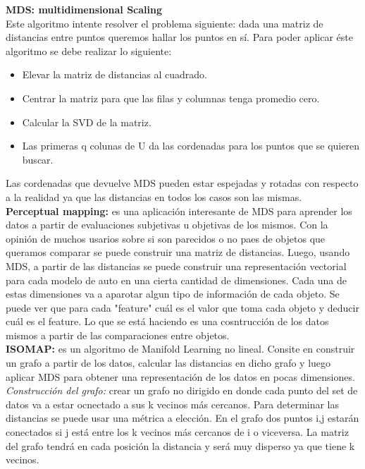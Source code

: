 \documentclass[titlepage,a4paper]{article}
\begin{document}
\textbf{MDS: multidimensional Scaling}\\

Este algoritmo intente resolver el problema siguiente: dada una matriz de distancias entre puntos queremos  hallar los puntos en sí. Para poder aplicar éste algoritmo se debe realizar lo siguiente: 
\begin{itemize}
\item Elevar la matriz de distancias al cuadrado.
\item Centrar la matriz para que las filas y columnas tenga promedio cero. 
\item Calcular la SVD de la matriz. 
\item Las primeras q colunas de U da las cordenadas para los puntos que se quieren buscar. 
\end{itemize}

Las cordenadas que devuelve MDS pueden estar espejadas y rotadas con respecto a la realidad ya que las distancias en todos los casos son las mismas.\\

\textbf{Perceptual mapping:} es una aplicación interesante de MDS para aprender los datos a partir de evaluaciones subjetivas u objetivas de los mismos. Con la opinión de muchos usarios sobre si son parecidos o no paes de objetos que queramos comparar se puede construir una matriz de distancias. Luego, usando MDS, a partir de las distancias se puede construir una representación vectorial para cada modelo de auto en una cierta cantidad de dimensiones. Cada una de estas dimensiones va a aparotar algun tipo de información de cada objeto. Se puede ver que para cada "feature" cuál es el valor que toma cada objeto y deducir cuál es el feature. Lo que se está haciendo es una cosntrucción de los datos mismos a partir de las comparaciones entre objetos. \\

\textbf{ISOMAP: } es un algoritmo de Manifold Learning no lineal. Consite en construir un grafo a partir de los datos, calcular las distancias en dicho grafo y luego aplicar MDS para obtener una representación de los datos en pocas dimensiones. \\

\textit{Construcción del grafo:} crear un grafo no dirigido en donde cada punto del set de datos va a estar ocnectado a sus k vecinos más cercanos. Para determinar las distancias se puede usar una métrica a elección. En el grafo dos puntos i,j estarán conectados si j está entre los k vecinos más cercanos de i o viceversa. La matriz del grafo tendrá en cada posición la distancia y será muy disperso ya que tiene k vecinos. \\
\end{document}

